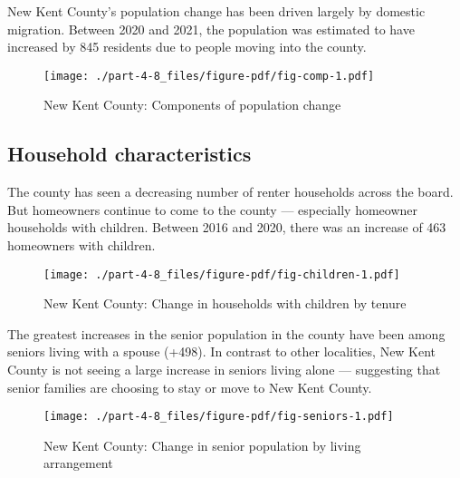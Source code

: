 \documentclass[
  letterpaper,
  DIV=11,
  numbers=noendperiod]{scrreprt}
\begin{document}
New Kent County's population change has been driven largely by domestic
migration. Between 2020 and 2021, the population was estimated to have
increased by 845 residents due to people moving into the county.

\begin{figure}

{\centering \texttt{[image: ./part-4-8\_files/figure-pdf/fig-comp-1.pdf]}

}

\caption{\label{fig-comp}New Kent County: Components of population
change}

\end{figure}

\hypertarget{household-characteristics-7}{%
\subsection{Household
characteristics}\label{household-characteristics-7}}

The county has seen a decreasing number of renter households across the
board. But homeowners continue to come to the county --- especially
homeowner households with children. Between 2016 and 2020, there was an
increase of 463 homeowners with children.

\begin{figure}

{\centering \texttt{[image: ./part-4-8\_files/figure-pdf/fig-children-1.pdf]}

}

\caption{\label{fig-children}New Kent County: Change in households with
children by tenure}

\end{figure}

The greatest increases in the senior population in the county have been
among seniors living with a spouse (+498). In contrast to other
localities, New Kent County is not seeing a large increase in seniors
living alone --- suggesting that senior families are choosing to stay or
move to New Kent County.

\begin{figure}

{\centering \texttt{[image: ./part-4-8\_files/figure-pdf/fig-seniors-1.pdf]}

}

\caption{\label{fig-seniors}New Kent County: Change in senior population
by living arrangement}

\end{figure}
\end{document}
